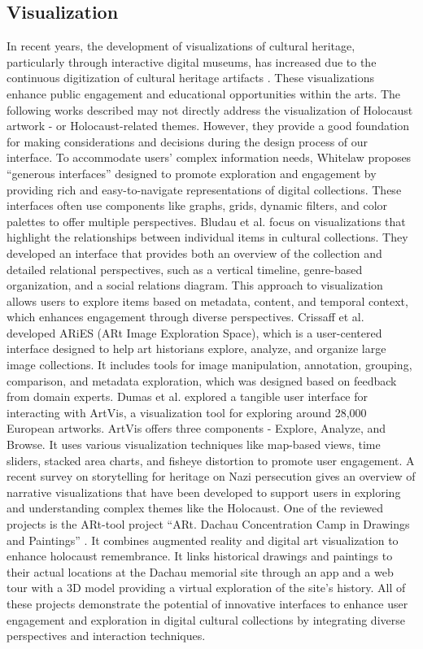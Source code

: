 \subsection{Visualization}
In recent years, the development of visualizations of cultural heritage, particularly through interactive digital museums, has increased due to the continuous digitization of cultural heritage artifacts \cite{windhager2019}. These visualizations enhance public engagement and educational opportunities within the arts. The following works described may not directly address the visualization of Holocaust artwork - or Holocaust-related themes. However, they provide a good foundation for making considerations and decisions during the design process of our interface.
To accommodate users’ complex information needs, Whitelaw \cite{whitelaw2015} proposes “generous interfaces” designed to promote exploration and engagement by providing rich and easy-to-navigate representations of digital collections. These interfaces often use components like graphs, grids, dynamic filters, and color palettes to offer multiple perspectives.
Bludau et al. \cite{bludau2021} focus on visualizations that highlight the relationships between individual items in cultural collections. They developed an interface that provides both an overview of the collection and detailed relational perspectives, such as a vertical timeline, genre-based organization, and a social relations diagram. This approach to visualization allows users to explore items based on metadata, content, and temporal context, which enhances engagement through diverse perspectives.
Crissaff et al. \cite{crissaff2018} developed ARiES (ARt Image Exploration Space), which is a user-centered interface designed to help art historians explore, analyze, and organize large image collections. It includes tools for image manipulation, annotation, grouping, comparison, and metadata exploration, which was designed based on feedback from domain experts. 
Dumas et al. \cite{dumas2014} explored a tangible user interface for interacting with ArtVis, a visualization tool for exploring around 28,000 European artworks. ArtVis offers three components - Explore, Analyze, and Browse. It uses various visualization techniques like map-based views, time sliders, stacked area charts, and fisheye distortion to promote user engagement. 
A recent survey on storytelling for heritage on Nazi persecution \cite{meffert2024} gives an overview of narrative visualizations that have been developed to support users in exploring and understanding complex themes like the Holocaust. One of the reviewed projects is the ARt-tool project “ARt. Dachau Concentration Camp in Drawings and Paintings” \cite{fink2024}. It combines augmented reality and digital art visualization to enhance holocaust remembrance. It links historical drawings and paintings to their actual locations at the Dachau memorial site through an app and a web tour with a 3D model providing a virtual exploration of the site’s history.
All of these projects demonstrate the potential of innovative interfaces to enhance user engagement and exploration in digital cultural collections by integrating diverse perspectives and interaction techniques.

